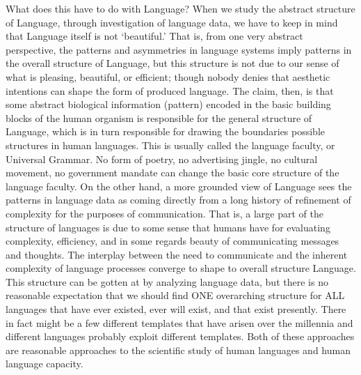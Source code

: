 \documentclass[11pt]{book}%
\theoremstyle{plain}
\numberwithin{equation}{section}
\theoremstyle{definition}
\newtheorem{phrase string}{Phrase String}
\begin{document}
What does this have to do with Language? When we study the abstract structure of Language, through investigation of language data, we have to keep in mind that Language itself is not `beautiful.' That is, from one very abstract perspective, the patterns and asymmetries in language systems imply patterns in the overall structure of Language, but this structure is not due to our sense of what is pleasing, beautiful, or efficient; though nobody denies that aesthetic intentions can shape the form of produced language. The claim, then, is that some abstract biological information (pattern) encoded in the basic building blocks of the human organism is responsible for the general structure of Language, which is in turn responsible for drawing the boundaries possible structures in human languages. This is usually called the language faculty, or Universal Grammar. No form of poetry, no advertising jingle, no cultural movement, no government mandate can change the basic core structure of the language faculty. On the other hand, a more grounded view of Language sees the patterns in language data as coming directly from a long history of refinement of complexity for the purposes of communication. That is, a large part of the structure of languages is due to some sense that humans have for evaluating complexity, efficiency, and in some regards beauty of communicating messages and thoughts. The interplay between the need to communicate and the inherent complexity of language processes converge to shape to overall structure Language. This structure can be gotten at by analyzing language data, but there is no reasonable expectation that we should find ONE overarching structure for ALL languages that have ever existed, ever will exist, and that exist presently. There in fact might be a few different templates that have arisen over the millennia and different languages probably exploit different templates. Both of these approaches are reasonable approaches to the scientific study of human languages and human language capacity. 
\end{document}
